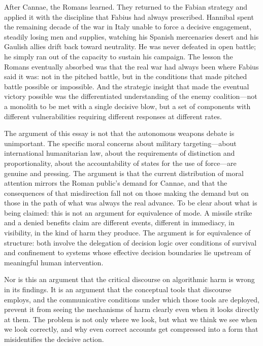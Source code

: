 \documentclass[12pt, a4paper]{article}
\begin{document}
After Cannae, the Romans learned. They returned to the Fabian strategy and applied it with the discipline that Fabius had always prescribed. Hannibal spent the remaining decade of the war in Italy unable to force a decisive engagement, steadily losing men and supplies, watching his Spanish mercenaries desert and his Gaulish allies drift back toward neutrality. He was never defeated in open battle; he simply ran out of the capacity to sustain his campaign. The lesson the Romans eventually absorbed was that the real war had always been where Fabius said it was: not in the pitched battle, but in the conditions that made pitched battle possible or impossible. And the strategic insight that made the eventual victory possible was the differentiated understanding of the enemy coalition---not a monolith to be met with a single decisive blow, but a set of components with different vulnerabilities requiring different responses at different rates.

The argument of this essay is not that the autonomous weapons debate is unimportant. The specific moral concerns about military targeting---about international humanitarian law, about the requirements of distinction and proportionality, about the accountability of states for the use of force---are genuine and pressing. The argument is that the current distribution of moral attention mirrors the Roman public's demand for Cannae, and that the consequences of that misdirection fall not on those making the demand but on those in the path of what was always the real advance. To be clear about what is being claimed: this is not an argument for equivalence of mode. A missile strike and a denied benefits claim are different events, different in immediacy, in visibility, in the kind of harm they produce. The argument is for equivalence of structure: both involve the delegation of decision logic over conditions of survival and confinement to systems whose effective decision boundaries lie upstream of meaningful human intervention.

Nor is this an argument that the critical discourse on algorithmic harm is wrong in its findings. It is an argument that the conceptual tools that discourse employs, and the communicative conditions under which those tools are deployed, prevent it from seeing the mechanisms of harm clearly even when it looks directly at them. The problem is not only where we look, but what we think we see when we look correctly, and why even correct accounts get compressed into a form that misidentifies the decisive action.
\end{document}
